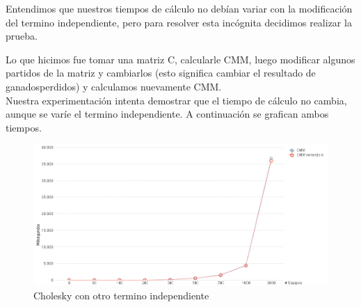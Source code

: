 Entendimos que nuestros tiempos de cálculo no debían variar con la modificación del termino independiente, pero para resolver esta incógnita decidimos realizar la prueba.

Lo que hicimos fue tomar una matriz C, calcularle CMM, luego modificar algunos partidos de la matriz y cambiarlos (esto significa cambiar el resultado de ganados\/perdidos) y calculamos 
nuevamente CMM. \\

Nuestra experimentación intenta demostrar que el tiempo de cálculo no cambia, aunque se varíe el termino independiente.
A continuación se grafican ambos tiempos.\\

\begin{figure}[H]
\centering
\includegraphics[width=1\textwidth]{IMG/Cholesky con otro termino independiente.png}
\caption{Cholesky con otro termino independiente}
\label{fig:Cholesky con otro termino independiente}
\end{figure}

